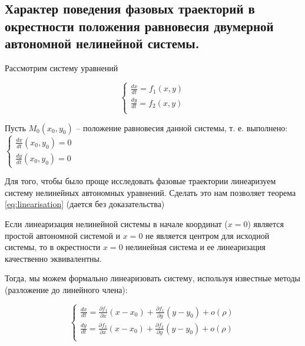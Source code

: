 
\subsection{Характер поведения фазовых траекторий в окрестности положения равновесия двумерной автономной нелинейной системы.}

Рассмотрим систему уравнений

\begin{equation}
  \begin{cases}
    \frac{d x}{d t} = f_1 (x, y) \\
    \frac{d y}{d t} = f_2 (x, y) \\
  \end{cases} 
\end{equation}

Пусть $M_0(x_0, y_0)$ -- положение равновесия данной системы, т. е. выполнено:
$\begin{cases}
  \frac{d x}{d t}(x_0, y_0) = 0 \\
  \frac{d y}{d t}(x_0, y_0) = 0
\end{cases}$

Для того, чтобы было проще исследовать фазовые траектории линеаризуем систему нелинейных автономных уравнений. Сделать это нам позволяет теорема \eqref{eq:linearisation} (дается без доказательства)

\begin{theorem} \label{eq:linearisation}
  Если линеаризация нелинейной системы в начале координат ($x = 0$) является простой автономной системой и $x = 0$ не является центром для исходной системы, то в окрестности $x = 0$ нелинейная система и ее линеаризация качественно эквивалентны.
\end{theorem}

Тогда, мы можем формально линеаризовать систему, используя известные методы (разложение до линейного члена):

\begin{equation}
  \begin{cases}
    \frac{d x}{d t} = \frac{\partial f_1}{\partial x} (x - x_0) + \frac{\partial f_1}{\partial y} (y - y_0) + o(\rho) \\
    \frac{d y}{d t} = \frac{\partial f_2}{\partial x} (x - x_0) + \frac{\partial f_2}{\partial y} (y - y_0) + o(\rho) \\        
  \end{cases}
\end{equation}

